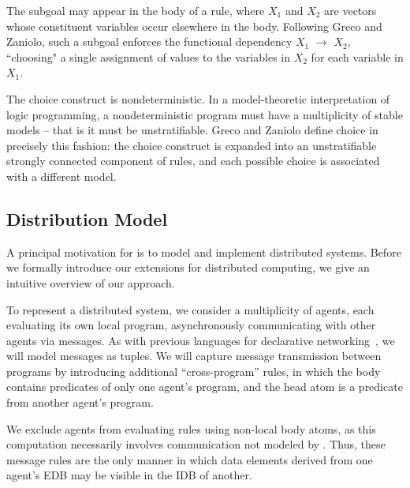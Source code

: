 The subgoal  may appear in the body of a rule, where
\emph{$X_1$} and \emph{$X_2$} are vectors whose constituent variables occur elsewhere in the body.  Following Greco and Zaniolo, such a subgoal
enforces the functional dependency \emph{$X_1$} $\to$ $X_2$, ``choosing" a single assignment of values to the variables
in \emph{$X_2$} for each variable in \emph{$X_1$}.

The choice construct is nondeterministic.  In a model-theoretic interpretation of logic programming, a nondeterministic program 
must have a multiplicity of stable models -- that is it must be unstratifiable.  Greco and Zaniolo define 
choice in precisely this fashion: the choice construct is expanded into an unstratifiable strongly connected component of rules, 
and each possible choice is associated with a different model.

  

\subsection{Distribution Model}

A principal motivation for \lang is to model and implement distributed systems.   Before we formally introduce our extensions for distributed computing, we give an intuitive overview of our approach.

To represent a distributed system, we consider a multiplicity of agents, each evaluating its own local program, 
asynchronously communicating with other agents via messages. 
 As with previous languages for declarative networking~\cite{Loo2009-CACM}, we will model messages as
tuples.  We will capture message transmission between programs by introducing additional ``cross-program'' rules, in which the body contains predicates of only one
agent's program, and the head atom is a predicate from another agent's program.  

We exclude agents from evaluating rules using non-local body atoms, as this computation necessarily involves communication
not modeled by \lang.  Thus, these message rules are the only manner in which data
elements derived from one agent's EDB may be visible in the IDB of another.  

